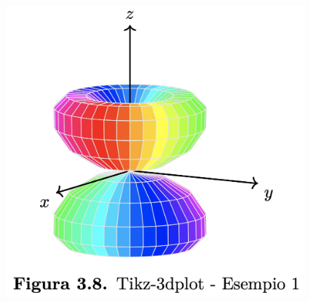 \begin{figure}[ht]\centering
\includegraphics[scale=.6]{FileAusiliari/Screenshots/Figura3-8.png}
\end{figure}

